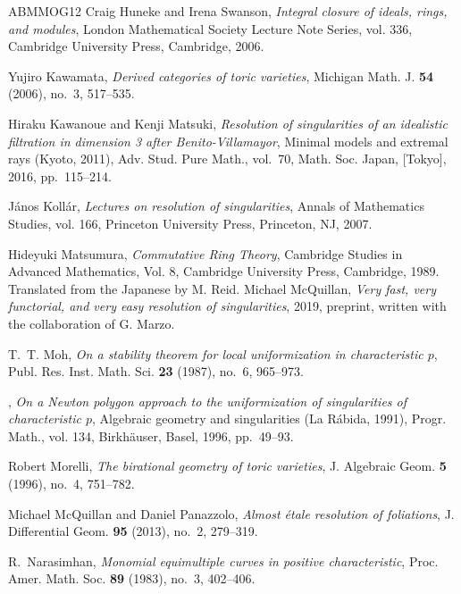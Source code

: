 \documentclass{amsart}
\begin{document}
\begin{thebibliography}{ABMMOG12}
Craig Huneke and Irena Swanson, \emph{Integral closure of ideals, rings, and
  modules}, London Mathematical Society Lecture Note Series, vol. 336,
  Cambridge University Press, Cambridge, 2006. 


Yujiro Kawamata, \emph{Derived categories of toric varieties}, Michigan Math.
  J. \textbf{54} (2006), no.~3, 517--535. 

Hiraku Kawanoue and Kenji Matsuki, \emph{Resolution of singularities of an
  idealistic filtration in dimension 3 after {B}enito-{V}illamayor}, Minimal
  models and extremal rays ({K}yoto, 2011), Adv. Stud. Pure Math., vol.~70,
  Math. Soc. Japan, [Tokyo], 2016, pp.~115--214. 

J{\'a}nos Koll{\'a}r, \emph{Lectures on resolution of singularities}, Annals of
  Mathematics Studies, vol. 166, Princeton University Press, Princeton, NJ,
  2007. 

Hideyuki Matsumura,
\textit{Commutative Ring Theory},
Cambridge Studies in Advanced Mathematics, Vol. 8,
Cambridge University Press, Cambridge, 1989.
Translated from the Japanese by M. Reid.
Michael McQuillan, \emph{{Very fast, very functorial, and very easy resolution
  of singularities}}, 2019, preprint, written with the collaboration of G.
  Marzo.

T.~T. Moh, \emph{On a stability theorem for local uniformization in
  characteristic {$p$}}, Publ. Res. Inst. Math. Sci. \textbf{23} (1987), no.~6,
  965--973. 

\bysame, \emph{On a {N}ewton polygon approach to the uniformization of
  singularities of characteristic {$p$}}, Algebraic geometry and singularities
  ({L}a {R}\'{a}bida, 1991), Progr. Math., vol. 134, Birkh\"{a}user, Basel,
  1996, pp.~49--93. 

Robert Morelli, \emph{The birational geometry of toric varieties}, J. Algebraic
  Geom. \textbf{5} (1996), no.~4, 751--782. 

Michael McQuillan and Daniel Panazzolo, \emph{Almost \'{e}tale resolution of
  foliations}, J. Differential Geom. \textbf{95} (2013), no.~2, 279--319.

R.~Narasimhan, \emph{Monomial equimultiple curves in positive characteristic},
  Proc. Amer. Math. Soc. \textbf{89} (1983), no.~3, 402--406. 


\end{thebibliography}
\end{document}
